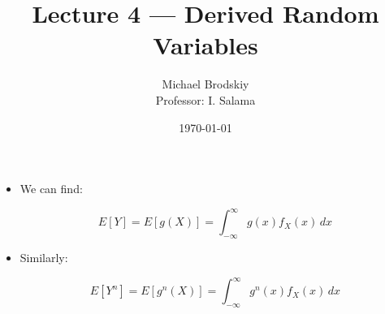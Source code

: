 


\title{Lecture 4 — Derived Random Variables}
\date{\today}
\author{Michael Brodskiy\\ \small Professor: I. Salama}



\maketitle

\begin{itemize}

  \item We can find:

    $$E[Y]=E[g(X)]=\int_{-\infty}^{\infty} g(x)f_X(x)\,dx$$

  \item Similarly:

    $$E[Y^n]=E[g^n(X)]=\int_{-\infty}^{\infty} g^n(x)f_X(x)\,dx$$

\end{itemize}



